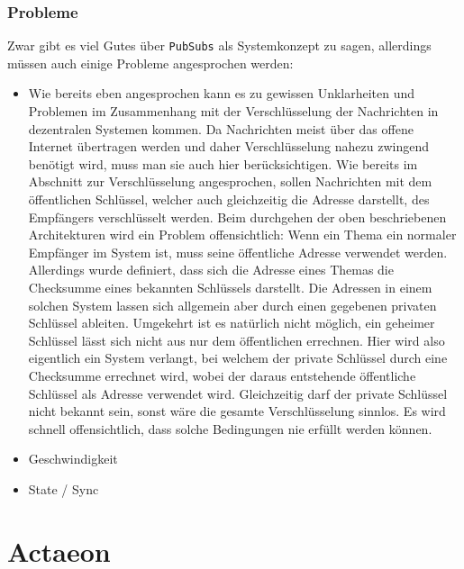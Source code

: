 \documentclass[11pt]{article}
\begin{document}
\subsubsection{Probleme}
\label{sec:org150a513}
Zwar gibt es viel Gutes über \texttt{PubSubs} als Systemkonzept zu sagen,
allerdings müssen auch einige Probleme angesprochen werden:
\begin{itemize}
\item Wie bereits eben angesprochen kann es zu gewissen Unklarheiten und
Problemen im Zusammenhang mit der Verschlüsselung der Nachrichten in
dezentralen Systemen kommen. Da Nachrichten meist über das offene
Internet übertragen werden und daher Verschlüsselung nahezu zwingend
benötigt wird, muss man sie auch hier berücksichtigen. Wie bereits
im Abschnitt zur Verschlüsselung angesprochen, sollen Nachrichten
mit dem öffentlichen Schlüssel, welcher auch gleichzeitig die
Adresse darstellt, des Empfängers verschlüsselt werden. Beim
durchgehen der oben beschriebenen Architekturen wird ein Problem
offensichtlich: Wenn ein Thema ein normaler Empfänger im System ist,
muss seine öffentliche Adresse verwendet werden. Allerdings wurde
definiert, dass sich die Adresse eines Themas die Checksumme eines
bekannten Schlüssels darstellt. Die Adressen in einem solchen System
lassen sich allgemein aber durch einen gegebenen privaten Schlüssel
ableiten. Umgekehrt ist es natürlich nicht möglich, ein geheimer
Schlüssel lässt sich nicht aus nur dem öffentlichen errechnen. Hier
wird also eigentlich ein System verlangt, bei welchem der private
Schlüssel durch eine Checksumme errechnet wird, wobei der daraus
entstehende öffentliche Schlüssel als Adresse verwendet wird.
Gleichzeitig darf der private Schlüssel nicht bekannt sein, sonst
wäre die gesamte Verschlüsselung sinnlos. Es wird schnell
offensichtlich, dass solche Bedingungen nie erfüllt werden können.
\item Geschwindigkeit
\item State / Sync
\end{itemize}

\section{Actaeon}
\label{sec:org5dbbeef}
\end{document}
